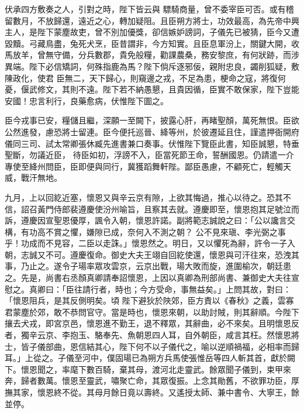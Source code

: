 \begin{pinyinscope}
 伏承四方敷奏之人，引對之時，陛下皆云與
 驃騎商量，曾不委宰臣可否。或有稽留數月，不放歸還，遠近之心，轉加疑阻。且臣朔方將士，功效最高，為先帝中興主人，是陛下蒙塵故吏，曾不別加優獎，卻信嫉妒謗詞，子儀先已被猜，臣今又遭毀黷。弓藏鳥盡，兔死犬烹，臣昔謂非，今方知實。且臣息軍汾上，關鍵大開，收馬放羊，曾無守備，分兵數郡，貴免般糧，勸課農桑，務安黎庶，有何狀跡，而涉異端。陛下必信矯詞，何殊指鹿為馬？陛下倘斥逐邪佞，親附忠良，蠲削狐疑，敷陳政化，使君
 臣無二，天下歸心，則窺邊之戎，不足為患，梗命之寇，將復何憂，偃武修文，其則不遠。陛下若不納愚懇，且貴因循，臣實不敢保家，陛下豈能安國！忠言利行，良藥愈病，伏惟陛下圖之。



 臣今戎事已安，糧儲且繼，深願一至闕下，披露心肝，再睹聖顏，萬死無恨。臣欲公然進發，慮恐將士留連。臣今便托巡晉、絳等州，於彼遷延且住，謹遣押衙開府儀同三司、試太常卿張休臧先進書兼口奏事。伏惟陛下覽臣此書，知臣誠懇，特垂聖斷，勿議近臣，
 待臣如初，浮謗不入，臣當死節王命，誓酬國恩。仍請遣一介專使至絳州問臣，臣即便與同行，冀獲蹈舞軒陛。鄙臣愚慮，不顧死亡，輕觸天威，戰汗無地。



 九月，上以回紇近塞，懷恩又與辛云京有隙，上欲其悔過，推心以待之。恐其不信，詔召黃門侍郎裴遵慶使汾州喻旨，且察其去就。遵慶即至，懷恩抱其足號泣而訴，遵慶因宣聖恩優厚，諷令入朝，懷恩許諾。副將範志誠說之曰：「公以讒言交構，有功高不賞之懼，嫌隙已成，奈何入不測之朝？
 公不見來瑱、李光弼之事乎！功成而不見容，二臣以走誅。」懷恩然之。明日，又以懼死為辭，許令一子入朝，志誠又不可。遵慶復命。御史大夫王翊自回紇使還，懷恩與可汗往來，恐洩其事，乃止之。遂令子瑒率眾攻雲京，云京出戰，瑒大敗而旋，進圍榆次，朝廷患之。先是，尚書右丞顏真卿請奉詔懷恩，上因以真卿為刑部尚書、兼御史大夫往宣慰之。真卿曰：「臣往請行者，時也；今方受命，事無益矣。」上問其故，對曰：「懷恩阻兵，是其反側明矣。頃
 陛下避狄於陜郊，臣方責以《春秋》之義，雲寡君蒙塵於郊，敢不恭問官守。當是時也，懷恩來朝，以助討賊，則其辭順。今陛下攘去犬戎，即宮京邑，懷恩進不勤王，退不釋眾，其辭曲，必不來矣。且明懷恩反者，獨辛云京、李抱玉、駱奉先、魚朝恩四人耳，自外朝臣，咸言其枉。然懷恩將士，皆子儀部曲，恩信結其心，陛下何不以子儀代之，喻以逆順禍福，必相率而歸耳。」上從之。子儀至河中，僕固瑒已為朔方兵馬使張惟岳等四人斬其首，獻於闕
 下。懷恩聞之，率麾下數百騎，棄其母，渡河北走靈武。餘眾聞子儀到，束甲來奔，歸者數萬。懷恩至靈武，嘯聚亡命，其眾復振。上念其勛舊，不欲罪功臣，厚撫其家，懷恩終不從。其母月餘日竟以壽終。又遙授太師、兼中書令、大寧王，餘並停。




\end{pinyinscope}
